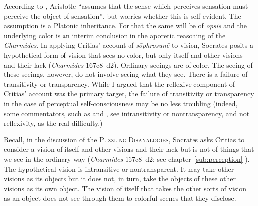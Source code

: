 According to \citet[435]{Hicks:1907uq}, Aristotle ``assumes that the sense which perceives sensation must perceive the object of sensation'', but worries whether this is self-evident. The assumption is a Platonic inheritance. For that the same will be of \emph{opsis} and the underlying color is an interim conclusion in the aporetic reasoning of the \emph{Charmides}. In applying Critias' account of \emph{sōphrosunē} to vision, Socrates posits a hypothetical form of vision that sees no color, but only itself and other visions and their lack (\emph{Charmides} 167c8–d2). Ordinary seeings are of color. The seeing of these seeings, however, do not involve seeing what they see. There is a failure of transitivity or transparency.  While I argued that the reflexive component of Critias' account was the primary target, the failure of transitivity or transparency in the case of perceptual self-consciousness may be no less troubling (indeed, some commentators, such as \citealt[202–3]{Sorabji:2006aa} and \citealt{Tsouna:2022aa}, see intransitivity or nontransparency, and not reflexivity, as the real difficulty.)

Recall, in the discussion of the \textsc{Puzzling Disanalogies}, Socrates asks Critias to consider a vision of itself and other visions and their lack but is not of things that we see in the ordinary way (\emph{Charmides} 167c8–d2; see chapter~\ref{sub:perception} ). The hypothetical vision is intransitive or nontransparent. It may take other visions as its objects but it does not, in turn, take the objects of these other visions as its own object. The vision of itself that takes the
other sorts of vision as an object does not see through them to colorful scenes that they disclose. 


